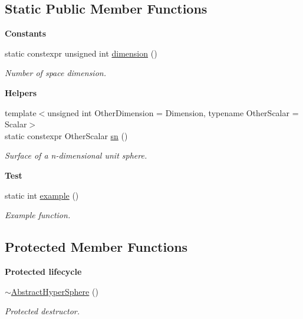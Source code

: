 \subsection*{Static Public Member Functions}
\begin{Indent}{\bf Constants}\par
\begin{DoxyCompactItemize}
\item 
static constexpr unsigned int \hyperlink{classmagrathea_1_1AbstractHyperSphere_a93e069229d61e08a6026000e21dedb2e}{dimension} ()
\begin{DoxyCompactList}\small\item\em Number of space dimension. \end{DoxyCompactList}\end{DoxyCompactItemize}
\end{Indent}
\begin{Indent}{\bf Helpers}\par
\begin{DoxyCompactItemize}
\item 
{\footnotesize template$<$unsigned int Other\-Dimension = Dimension, typename Other\-Scalar  = Scalar$>$ }\\static constexpr Other\-Scalar \hyperlink{classmagrathea_1_1AbstractHyperSphere_ac636769913d527319bde86deb2f1863c}{sn} ()
\begin{DoxyCompactList}\small\item\em Surface of a n-\/dimensional unit sphere. \end{DoxyCompactList}\end{DoxyCompactItemize}
\end{Indent}
\begin{Indent}{\bf Test}\par
\begin{DoxyCompactItemize}
\item 
static int \hyperlink{classmagrathea_1_1AbstractHyperSphere_a0d1fb9a90aeb540754e9f5f2b13c407f}{example} ()
\begin{DoxyCompactList}\small\item\em Example function. \end{DoxyCompactList}\end{DoxyCompactItemize}
\end{Indent}
\subsection*{Protected Member Functions}
\begin{Indent}{\bf Protected lifecycle}\par
\begin{DoxyCompactItemize}
\item 
\hyperlink{classmagrathea_1_1AbstractHyperSphere_a1fcfa26ef0a672e9deb79ca4040099c0}{$\sim$\-Abstract\-Hyper\-Sphere} ()
\begin{DoxyCompactList}\small\item\em Protected destructor. \end{DoxyCompactList}\end{DoxyCompactItemize}
\end{Indent}


